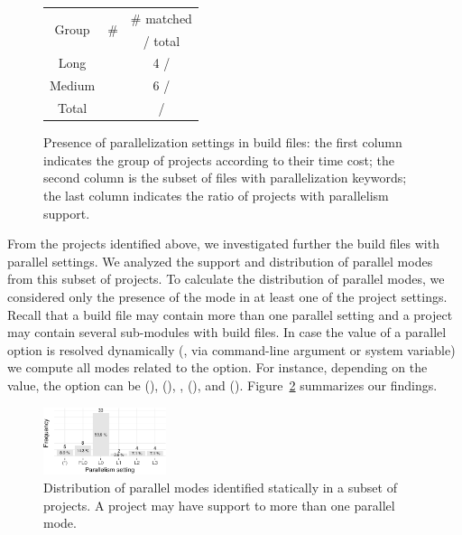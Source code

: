 \begin{figure}[ht!]
    \centering
    \begin{tabular*}{0.48\textwidth}{@{\extracolsep{\fill}}ccc}
        \toprule
        \multirow{2}{*}{Group} %
            & \multirow{2}{*}{\# \pomf{}}
	    & \# \pomf{} matched\\
            & %
            & / total\\%
        \midrule%
	Long   & \numPomLong{} & 4 / \numLong{}\\%
	Medium & \numPomMed{} & 6 / \numMed{}\\%
        \midrule%
        Total %
            & \pomMedLong{}
            & \numProjectsPar{} / \numMedLong{}\\%
        \bottomrule%
    \end{tabular*}
    \caption{Presence of parallelization settings in build files: the
    first column indicates the group of projects according to their
    time cost; the second column is the subset of files with parallelization
    keywords; the last column indicates the ratio of projects with
    parallelism support.}
    \label{tab:inspection-table} 
\end{figure}

 From the \numProjectsPar{} projects
identified above, we investigated further the \numPomMatched{}
build files with parallel settings.  We analyzed the support and
distribution of parallel modes from this subset of projects. To
calculate the distribution of parallel modes, we considered only the
presence of the mode in at least one of the project settings.  Recall
that a build file may contain more than one parallel setting and a
project may contain several sub-modules with build files.  In case the
value of a parallel option is resolved dynamically (\eg, via
command-line argument or system variable) we compute all modes related
to the option. For instance, depending on the value, the
 option can be \Seq{} (),
\ParClassSeqMeth{} (), \SeqClassParMeth{},
(), and \ParClassParMeth{} ().
Figure~\ref{fig:freqmodes-static} summarizes our findings.

\begin{figure}[h!]
    \centering
    \includegraphics[width=0.32\textwidth]{plots/barplot-modes-static.pdf}
    \caption{\label{fig:freqmodes-static}Distribution of parallel modes
    identified statically in a subset of \numProjectsPar{} projects.
    A project may have support to more than one parallel mode.}
\end{figure}

